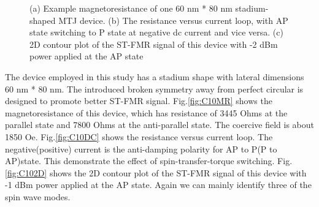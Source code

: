 \begin{figure}[!ht]
\centering
{}
\caption{(a) Example magnetoresistance of one 60 nm * 80 nm stadium-shaped MTJ device. (b) The resistance versus current loop, with AP state switching to P state at negative dc current and vice versa. (c) 2D contour plot of the ST-FMR signal of this device with -2 dBm power applied at the AP state }
\end{figure}

The device employed in this study has a stadium shape with lateral dimensions 60 nm * 80 nm. The introduced broken symmetry away from perfect circular is designed to promote better ST-FMR signal. Fig.\ref{fig:C10MR} shows the magnetoresistance of this device, which has resistance of 3445 Ohms at the parallel state and 7800 Ohms at the anti-parallel state. The coercive field is about 1850 Oe. Fig.\ref{fig:C10DC} shows the resistance versus current loop. The negative(positive) current is the anti-damping polarity for AP to P(P to AP)state. This demonstrate the effect of spin-transfer-torque switching. Fig.\ref{fig:C102D} shows the 2D contour plot of the ST-FMR signal of this device with -1 dBm power applied at the AP state. Again we can mainly identify three of the spin wave modes. 

